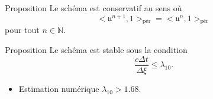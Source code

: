\documentclass[11pt]{beamer}
\begin{document}
\begin{frame}{}
\begin{block}{Proposition}
Le schéma est conservatif au sens où
$$
<\mathfrak{u}^{n+1},\mathfrak{1}>_{\text{pér}} = <\mathfrak{u}^{n},\mathfrak{1}>_{\text{pér}}
$$
pour tout $n \in \mathbb{N}$.
\end{block}
\begin{block}{Proposition}
Le schéma est stable sous la condition
$$
\dfrac{c \Delta t}{\Delta \xi} \leq \lambda_{10}.
$$
\begin{itemize}
\item Estimation numérique $\lambda_{10} > 1.68$.
\end{itemize} 
\end{block}
\end{frame}
\end{document}
